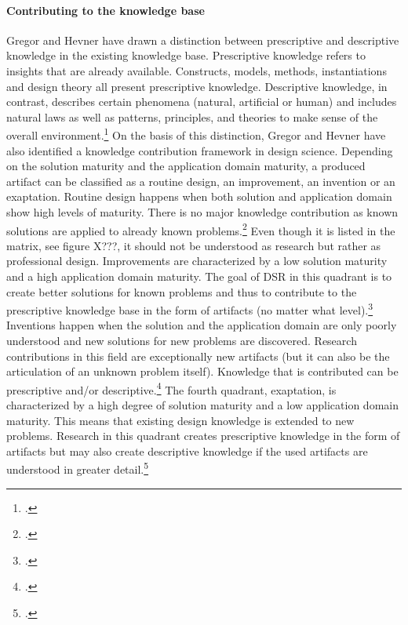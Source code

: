 \paragraph{Contributing to the knowledge base} Gregor and Hevner have drawn a distinction between prescriptive and descriptive knowledge in the existing knowledge base. Prescriptive knowledge refers to insights that are already available. Constructs, models, methods, instantiations and design theory all present prescriptive knowledge. Descriptive knowledge, in contrast, describes certain phenomena (natural, artificial or human) and includes natural laws as well as patterns, principles, and theories to make sense of the overall environment.\footcite[Cf.][p.344]{GregorPositioningpresentingdesign2013} On the basis of this distinction, Gregor and Hevner have also identified a knowledge contribution framework in design science. Depending on the solution maturity and the application domain maturity, a produced artifact can be classified as a routine design, an improvement, an invention or an exaptation. Routine design happens when both solution and application domain show high levels of maturity. There is no major knowledge contribution as known solutions are applied to already known problems.\footcite[Cf.][p.348]{GregorPositioningpresentingdesign2013} Even though it is listed in the matrix, see figure X???, it should not be understood as research but rather as professional design. Improvements are characterized by a low solution maturity and a high application domain maturity. The goal of DSR in this quadrant is to create better solutions for known problems and thus to contribute to the prescriptive knowledge base in the form of artifacts (no matter what level).\footcite[Cf.][p.346]{GregorPositioningpresentingdesign2013} Inventions happen when the solution and the application domain are only poorly understood and new solutions for new problems are discovered. Research contributions in this field are exceptionally new artifacts (but it can also be the articulation of an unknown problem itself). Knowledge that is contributed can be prescriptive and/or descriptive.\footcite[Cf.][pp.345,346]{GregorPositioningpresentingdesign2013} The fourth quadrant, exaptation, is characterized by a high degree of solution maturity and a low application domain maturity. This means that existing design knowledge is extended to new problems. Research in this quadrant creates prescriptive knowledge in the form of artifacts but may also create descriptive knowledge if the used artifacts are understood in greater detail.\footcite[Cf.][p.347]{GregorPositioningpresentingdesign2013}


